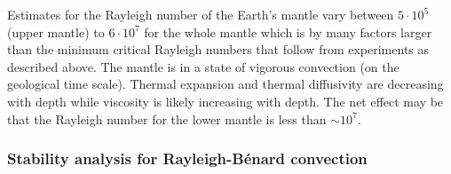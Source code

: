 Estimates for the Rayleigh number of the Earth's mantle vary between $5\cdot 10^5$ (upper
mantle) to $6\cdot 10^7$ for the whole mantle which is by many factors larger than the minimum
critical Rayleigh numbers that follow from experiments as described above. The mantle
is in a state of vigorous convection (on the geological time scale). Thermal expansion and
thermal diffusivity are decreasing with depth while viscosity is likely increasing with
depth. The net effect may be that the Rayleigh number for the lower mantle is less than $\sim 10^7$.



\newpage %
\subsubsection{Stability analysis for Rayleigh-B\'enard convection} \label{ss:sarb} 






